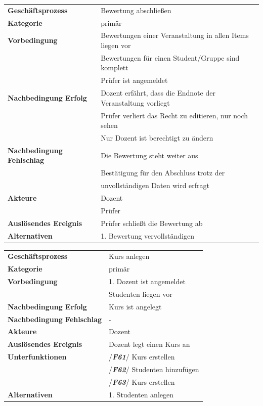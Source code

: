 \begin{table}[H]
	\begin{tabular}{|ll}
		\rowcolor{hellgrau}\multicolumn{2}{l}{/\textbf{\textit{F50}}/}\\\hline
		 \textbf{Geschäftsprozess} & Bewertung abschließen\\ 
		 \textbf{Kategorie} & primär \\ 
		 \textbf{Vorbedingung} & Bewertungen einer Veranstaltung in allen Items liegen vor\\
		 & Bewertungen für einen Student/Gruppe sind komplett\\
		 & Prüfer ist angemeldet \\ 
		 \textbf{Nachbedingung Erfolg} & Dozent erfährt, dass die Endnote der Veranstaltung vorliegt  \\ 
		 & Prüfer verliert das Recht zu editieren, nur noch sehen\\
		 & Nur Dozent ist berechtigt zu ändern\\
		 \textbf{Nachbedingung Fehlschlag} &  Die Bewertung steht weiter aus\\
		 & Bestätigung für den Abschluss trotz der \\
		 & unvollständigen Daten wird erfragt\\ 
		 \textbf{Akteure} & Dozent \\ 
		 & Prüfer\\
		 \textbf{Auslösendes Ereignis} & Prüfer schließt die Bewertung ab \\ 
		 \textbf{Alternativen} & 1. Bewertung vervollständigen \\
		 \end{tabular} 
	\label{tab:F50}
	\end{table}		
			
	\begin{table}[H]
		\begin{tabular}{|ll}
			\rowcolor{hellgrau}\multicolumn{2}{l}{/\textbf{\textit{F60}}/}\\\hline
			 \textbf{Geschäftsprozess} & Kurs anlegen\\ 
			 \textbf{Kategorie} & primär \\ 
			 \textbf{Vorbedingung} & 1. Dozent ist angemeldet \phantom{aaaaaaaaaaaaaaaaaaaaaaaaaaaaaaa} \\
			  & Studenten liegen vor\\
			 \textbf{Nachbedingung Erfolg} & Kurs ist angelegt\\
			 \textbf{Nachbedingung Fehlschlag} & -\\
			 \textbf{Akteure} & Dozent \\ 
			 \textbf{Auslösendes Ereignis} & Dozent legt einen Kurs an\\ 
			 \textbf{Unterfunktionen} &  /\textbf{\textit{F61}}/  Kurs erstellen\\
			 & /\textbf{\textit{F62}}/  Studenten hinzufügen\\
			 & /\textbf{\textit{F63}}/  Kurs erstellen\\
			 \textbf{Alternativen} & 1. Studenten anlegen \\
			 \end{tabular} 
		\label{tab:F60}
		\end{table}
		
